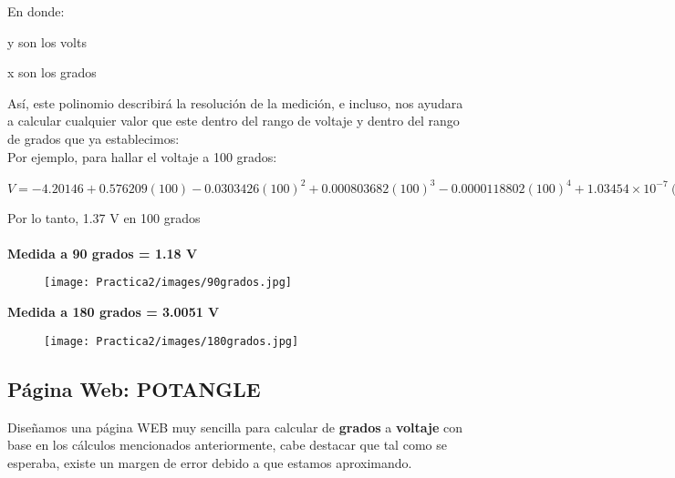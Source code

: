 \documentclass[12pt]{article}
\begin{document}
	    \begin{figure}[h!]
	    \centering
            \end{figure}
        

        En donde:
        
        y son los volts
        
        x son los grados
        
        Así, este polinomio describirá la resolución de la medición, e incluso, nos ayudara a calcular cualquier valor que este dentro del rango de voltaje y dentro del rango de grados que ya establecimos:\\

        Por ejemplo, para hallar el voltaje a 100 grados:
        
        $V = -4.20146 + 0.576209 (100) - 0.0303426 (100)^2 + 0.000803682 (100)^3 -   0.0000118802 (100)^4 + 1.03454\times10^{-7} (100)^5 - 5.28161\times10^{-10} (100)^6 +   1.46335\times10^{-12} (100)^7 - 1.69911\times10^{-15} (100)^8 = 1.37834 V$
        
        Por lo tanto, 1.37 V en 100 grados
        \\
        \\
        \newpage
        \textbf{Medida a 90 grados = 1.18 V}
        \begin{figure}[h!]
                \centering
                \texttt{[image: Practica2/images/90grados.jpg]}
            \end{figure}
            
        \textbf{Medida a 180 grados = 3.0051 V}
        \begin{figure}[h!]
                \centering
                \texttt{[image: Practica2/images/180grados.jpg]}
            \end{figure}
        
    \newpage    
    \subsection{Página Web: POTANGLE}
    Diseñamos una página WEB muy sencilla para calcular de \textbf{grados} a \textbf{voltaje} con base en los cálculos mencionados anteriormente, cabe destacar que tal como se esperaba, existe un margen de error debido a que estamos aproximando. 
    
\end{document}
